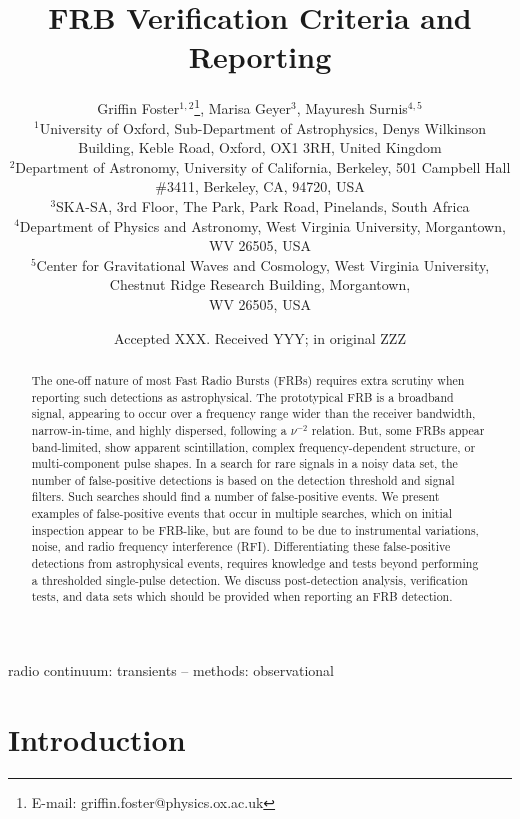 \documentclass[a4paper,fleqn,usenatbib]{mnras}
\title[FRB Verification Criteria and Reporting]{FRB Verification Criteria and Reporting}
\author[G. Foster et al.]{
Griffin Foster$^{1,2}$\thanks{E-mail: griffin.foster@physics.ox.ac.uk},
Marisa Geyer$^{3}$,
Mayuresh Surnis$^{4,5}$
\\
$^{1}$University of Oxford, Sub-Department of Astrophysics, Denys Wilkinson Building, Keble Road, Oxford, OX1 3RH, United Kingdom\\
$^{2}$Department of Astronomy, University of California, Berkeley, 501 Campbell
Hall \#3411, Berkeley, CA, 94720, USA\\
$^{3}$SKA-SA, 3rd Floor, The Park, Park Road, Pinelands, South Africa\\
$^{4}$Department of Physics and Astronomy, West Virginia University, Morgantown, WV 26505, USA\\
$^{5}$Center for Gravitational Waves and Cosmology, West Virginia University, Chestnut Ridge Research Building, Morgantown,\\ WV 26505, USA\\
}
\date{Accepted XXX. Received YYY; in original ZZZ}
\begin{document}
\label{firstpage}
\pagerange{\pageref{firstpage}--\pageref{lastpage}}
\maketitle

\begin{abstract}
The one-off nature of most Fast Radio Bursts (FRBs) requires extra scrutiny when
reporting such detections as astrophysical.  The prototypical FRB is a broadband
signal, appearing to occur over a frequency range wider than the receiver
bandwidth, narrow-in-time, and highly dispersed, following a $\nu^{-2}$
relation.  But, some FRBs appear band-limited, show apparent scintillation,
complex frequency-dependent structure, or multi-component pulse shapes.  In a
search for rare signals in a noisy data set, the number of false-positive
detections is based on the detection threshold and signal filters.  Such
searches should find a number of false-positive events.  We present examples of
false-positive events that occur in multiple searches, which on initial
inspection appear to be FRB-like, but are found to be due to instrumental
variations, noise, and radio frequency interference (RFI).  Differentiating
these false-positive detections from astrophysical events, requires knowledge
and tests beyond performing a thresholded single-pulse detection.  We discuss
post-detection analysis, verification tests, and data sets which should be
provided when reporting an FRB detection.
\end{abstract}

\begin{keywords}
radio continuum: transients -- methods: observational
\end{keywords}


\section{Introduction}
\label{sec:intro}
\end{document}
